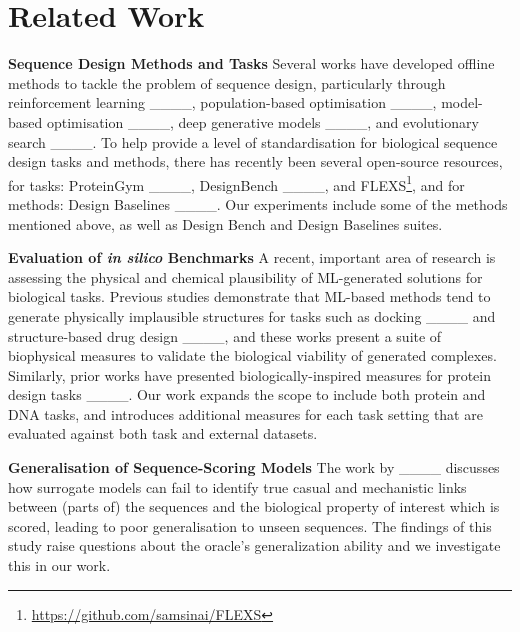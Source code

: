 \section{Related Work}
\label{sec:related_work}

\textbf{Sequence Design Methods and Tasks}
Several works have developed offline methods to tackle the problem of sequence design, particularly through reinforcement learning ____, population-based optimisation ____, model-based optimisation ____, deep generative models ____, and evolutionary search ____.
To help provide a level of standardisation for biological sequence design tasks and methods, there has recently been several open-source resources, for tasks:  ProteinGym ____, DesignBench ____, and FLEXS\footnote{\url{https://github.com/samsinai/FLEXS}}, and for methods: Design Baselines ____. Our experiments include some of the methods mentioned above, as well as Design Bench and Design Baselines suites.

\textbf{Evaluation of \textit{in silico} Benchmarks} A recent, important area of research is assessing the physical and chemical plausibility of ML-generated solutions for biological tasks. Previous studies demonstrate that ML-based methods tend to generate physically implausible structures for tasks such as docking ____ and structure-based drug design ____, and these works present a suite of biophysical measures to validate the biological viability of generated complexes. Similarly, prior works have presented biologically-inspired measures for protein design tasks ____. Our work expands the scope to include both protein and DNA tasks, and introduces additional measures for each task setting that are evaluated against both task and external datasets. 

\textbf{Generalisation of Sequence-Scoring Models} The work by ____ discusses how surrogate models can fail to identify true casual and mechanistic links between (parts of) the sequences and the biological property of interest which is scored, leading to poor generalisation to unseen sequences. The findings of this study raise questions about the oracle's generalization ability and we investigate this in our work.